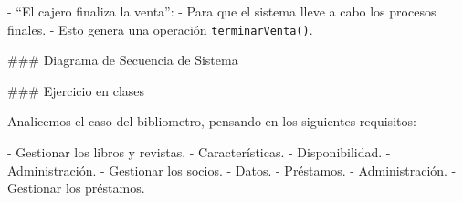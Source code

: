 \vfill

- ``El cajero finaliza la venta'':
    - Para que el sistema lleve a cabo los procesos finales.
    - Esto genera una operación \texttt{terminarVenta()}.

### Diagrama de Secuencia de Sistema



### Ejercicio en clases


Analicemos el caso del bibliometro, pensando en los siguientes requisitos:

- Gestionar los libros y revistas.
    - Características.
    - Disponibilidad.
    - Administración.
- Gestionar los socios.
    - Datos.
    - Préstamos.
    - Administración.
- Gestionar los préstamos.
